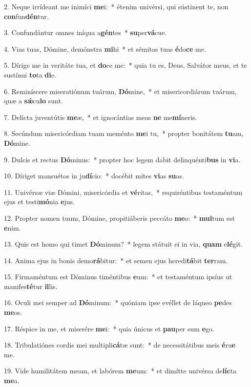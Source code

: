 2. Neque irrídeant me inimíci \textbf{me}i:~*  étenim univérsi, qui sústinent te, non \textbf{con}fun\textbf{dén}tur.\

3. Confundántur omnes iníqua a\textbf{gén}tes~*  \textbf{su}per\textbf{vá}cue.\

4. Vias tuas, Dómine, demónstra \textbf{mi}hi~*  et sémitas tuas \textbf{é}do\textbf{ce} me.\

5. Dírige me in veritáte tua, et \textbf{do}ce me:~*  quia tu es, Deus, Salvátor meus, et te sustínui \textbf{to}ta \textbf{di}e.\

6. Reminíscere miseratiónum tuárum, \textbf{Dó}mine,~*  et misericordiárum tuárum, quæ a \textbf{sǽ}cu\textbf{lo} sunt.\

7. Delícta juventútis \textbf{me}æ,~*  et ignorántias meas \textbf{ne} me\textbf{mí}neris.\

8. Secúndum misericórdiam tuam meménto \textbf{me}i tu,~*  propter bonitátem \textbf{tu}am, \textbf{Dó}mine.\

9. Dulcis et rectus \textbf{Dó}minus:~*  propter hoc legem dabit delinquénti\textbf{bus} in \textbf{vi}a.\

10. Díriget mansuétos in ju\textbf{dí}cio:~*  docébit mites \textbf{vi}as \textbf{su}as.\

11. Univérsæ viæ Dómini, misericórdia et \textbf{vé}ritas,~*  requiréntibus testaméntum ejus et testi\textbf{mó}nia \textbf{e}jus.\

12. Propter nomen tuum, Dómine, propitiáberis peccáto \textbf{me}o:~*  \textbf{mul}tum est \textbf{e}nim.\

13. Quis est homo qui timet \textbf{Dó}minum?~*  legem státuit ei in via, \textbf{quam} e\textbf{lé}git.\

14. Anima ejus in bonis demo\textbf{rá}bitur:~*  et semen ejus heredi\textbf{tá}bit \textbf{ter}ram.\

15. Firmaméntum est Dóminus timéntibus \textbf{e}um:~*  et testaméntum ipsíus ut manifes\textbf{té}tur \textbf{il}lis.\

16. Oculi mei semper ad \textbf{Dó}minum:~*  quóniam ipse evéllet de láqueo \textbf{pe}des \textbf{me}os.\

17. Réspice in me, et miserére \textbf{me}i:~*  quia únicus et \textbf{pau}per sum \textbf{e}go.\

18. Tribulatiónes cordis mei multipli\textbf{cá}tæ sunt:~*  de necessitátibus meis \textbf{é}ru\textbf{e} me.\

19. Vide humilitátem meam, et labórem \textbf{me}um:~*  et dimítte univérsa de\textbf{líc}ta \textbf{me}a.\


